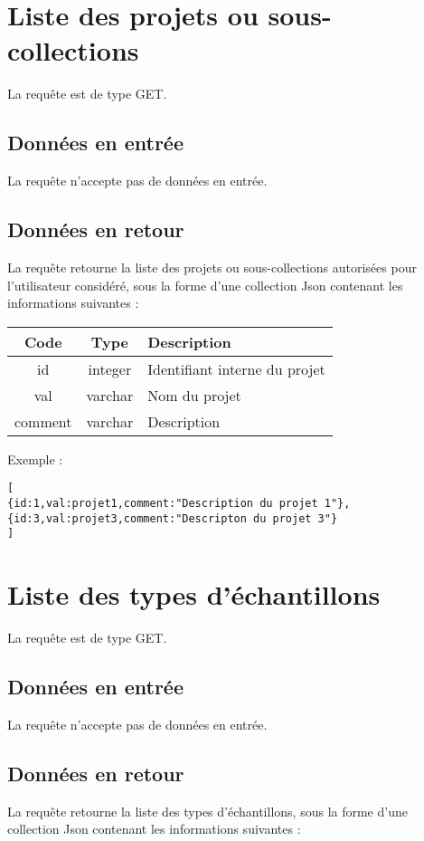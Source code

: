 \section{Liste des projets ou sous-collections}
\label{projectList}

La requête est de type GET.
\subsection{Données en entrée}
La requête n'accepte pas de données en entrée.

\subsection{Données en retour}
La requête retourne la liste des projets ou sous-collections autorisées pour l'utilisateur considéré, sous la forme d'une collection Json contenant les informations suivantes :

\begin{longtable}{|c|c|>{\raggedright\arraybackslash}p{6cm}|}
\hline 
Code & Type & Description \\ 
\hline
id & integer & Identifiant interne du projet\\
\hline
val & varchar & Nom du projet\\
\hline
comment & varchar & Description\\
\hline \endhead
\end{longtable}

Exemple :
\begin{lstlisting}
[
{id:1,val:projet1,comment:"Description du projet 1"},
{id:3,val:projet3,comment:"Descripton du projet 3"}
]
\end{lstlisting}



\section{Liste des types d'échantillons}
\label{sampleTypeList}

La requête est de type GET.
\subsection{Données en entrée}
La requête n'accepte pas de données en entrée.

\subsection{Données en retour}
La requête retourne la liste des types d'échantillons, sous la forme d'une collection Json contenant les informations suivantes :


